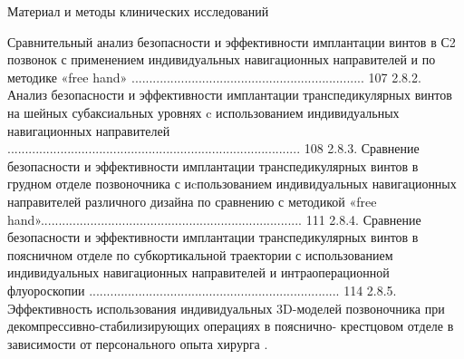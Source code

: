
Материал и методы клинических исследований 


Сравнительный анализ безопасности и эффективности имплантации
винтов в С2 позвонок с применением индивидуальных навигационных
направителей и по методике «free hand»
.................................................................. 107
2.8.2. Анализ безопасности и эффективности имплантации транспедикулярных
винтов на шейных субаксиальных уровнях c использованием индивидуальных
навигационных направителей
................................................................................... 108
2.8.3. Сравнение безопасности и эффективности имплантации
транспедикулярных винтов в грудном отделе позвоночника с иcпользованием
индивидуальных навигационных направителей различного дизайна по
сравнению с методикой «free
hand».......................................................................... 111
2.8.4. Сравнение безопасности и эффективности имплантации
транспедикулярных винтов в поясничном отделе по субкортикальной
траектории с использованием индивидуальных навигационных направителей
и интраоперационной флуороскопии
....................................................................... 114
2.8.5. Эффективность использования индивидуальных 3D-моделей
позвоночника при декомпрессивно-стабилизирующих операциях в пояснично-
крестцовом отделе в зависимости от персонального опыта хирурга .
